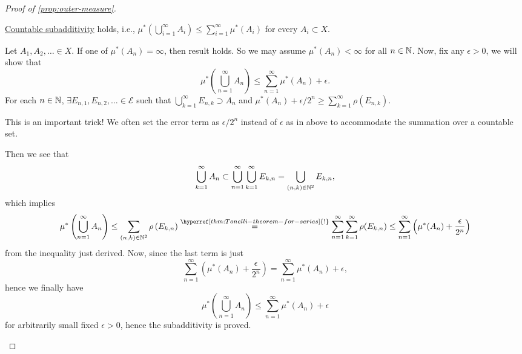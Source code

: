 \begin{proof}[Proof of \autoref{prop:outer-measure}]
	\begin{claim}
		\hyperref[def:outer-measure-countable-subadditivity]{Countable subadditivity} holds, i.e., \(\mu^{\ast} \left(\bigcup\limits_{i=1}^{\infty} A_{i}\right) \leq \sum\limits_{i=1}^{\infty} \mu^{\ast} (A_{i})\) for every \(A_{i} \subset X \).
	\end{claim}
	\begin{explanation}
		Let \(A_1, A_2, \ldots \in X \). If one of \(\mu^{\ast} (A_{n}) = \infty \), then result holds.
		So we may assume \(\mu^{\ast} (A_n)<\infty \) for all \(n\in \mathbb{\MakeUppercase{N}} \). Now, fix any \(\epsilon >0\),
		we will show that
		\[
			\mu^{\ast} \left(\bigcup\limits_{n=1}^{\infty} A_n\right)\leq \sum\limits_{n=1}^{\infty} \mu^{\ast} (A_n)+\epsilon.
		\]
		For each \(n\in\mathbb{\MakeUppercase{N}} \), \(\exists E_{n, 1}, E_{n, 2}, \ldots \in \mathcal{E}\) such that
		\(\bigcup\limits_{k=1}^{\infty} E_{n, k}\supset A_n\) and \(\mu^{\ast} (A_n) + \epsilon /2^n \geq \sum\limits_{k=1}^{\infty} \rho(E_{n, k})\).
		\begin{remark}
			This is an important trick! We often set the error term as \(\epsilon / 2^n\) instead of \(\epsilon \) as in above to accommodate the summation over
			a countable set.
		\end{remark}

		Then we see that
		\[
			\bigcup\limits_{k=1}^{\infty} A_n \subset \bigcup\limits_{n=1}^{\infty} \bigcup\limits_{k=1}^{\infty} E_{k, n} = \bigcup\limits_{(n, k)\in\mathbb{\MakeUppercase{N}} ^2} E_{k, n},
		\]
		which implies
		\[
			\mu^{\ast} \left(\bigcup\limits_{n=1}^{\infty} A_{n}\right)
			\leq \sum\limits_{(n, k)\in\mathbb{\MakeUppercase{N}} ^2} \rho\left(E_{k, n}\right)
			\overset{\hyperref[thm:Tonelli-theorem-for-series]{\text{!}}}{=} \sum\limits_{n=1}^{\infty} \sum\limits_{k=1}^{\infty} \rho(E_{k, n})
			\leq \sum\limits_{n=1}^{\infty} \left(\mu^{\ast} (A_n) + \frac{\epsilon}{2^n}\right)
		\]
		from the inequality just derived. Now, since the last term is just
		\[
			\sum\limits_{n=1}^{\infty} \left(\mu^{\ast} (A_n) + \frac{\epsilon}{2^n}\right) = \sum\limits_{n=1}^{\infty} \mu^{\ast} (A_n)+\epsilon,
		\]
		hence we finally have
		\[
			\mu^{\ast} \left(\bigcup\limits_{n=1}^{\infty} A_{n}\right)\leq \sum\limits_{n=1}^{\infty} \mu^{\ast} (A_n)+\epsilon
		\]
		for arbitrarily small fixed \(\epsilon >0\), hence the subadditivity is proved.
	\end{explanation}
\end{proof}

